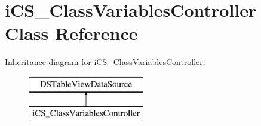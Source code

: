 \hypertarget{classi_c_s___class_variables_controller}{\section{i\+C\+S\+\_\+\+Class\+Variables\+Controller Class Reference}
\label{classi_c_s___class_variables_controller}
}
Inheritance diagram for i\+C\+S\+\_\+\+Class\+Variables\+Controller\+:\begin{figure}[H]
\begin{center}
\leavevmode
\includegraphics[height=2.000000cm]{classi_c_s___class_variables_controller}
\end{center}
\end{figure}
